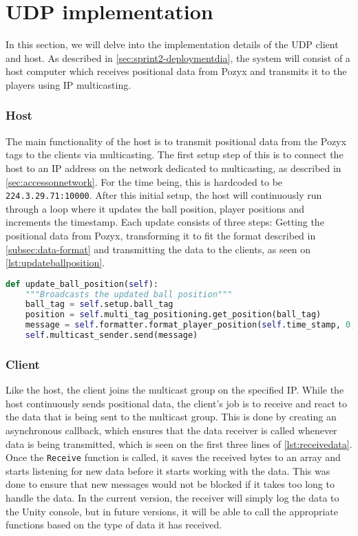 \section{UDP implementation}
In this section, we will delve into the implementation details of the UDP client and host.
As described in \autoref{sec:sprint2-deploymentdia}, the system will consist of a host computer which receives positional data from Pozyx and transmits it to the players using IP multicasting.

\subsubsection{Host}
The main functionality of the host is to transmit positional data from the Pozyx tags to the clients via multicasting.
The first setup step of this is to connect the host to an IP address on the network dedicated to multicasting, as described in \autoref{sec:accessonnetwork}.
For the time being, this is hardcoded to be \texttt{224.3.29.71:10000}.
After this initial setup, the host will continuously run through a loop where it updates the ball position, player positions and increments the timestamp.
\noindent
Each update consists of three steps: Getting the positional data from Pozyx, transforming it to fit the format described in \autoref{subsec:data-format} and transmitting the data to the clients, as seen on \autoref{lst:updateballposition}.

\begin{lstlisting}[caption={Updating ball position}, captionpos=b,language=Python,label={lst:updateballposition}]
def update_ball_position(self):
    """Broadcasts the updated ball position"""
    ball_tag = self.setup.ball_tag
    position = self.multi_tag_positioning.get_position(ball_tag)
    message = self.formatter.format_player_position(self.time_stamp, 0, position.x, position.y)
    self.multicast_sender.send(message)
\end{lstlisting}

\subsubsection{Client}
Like the host, the client joins the multicast group on the specified IP.
While the host continuously sends positional data, the client's job is to receive and react to the data that is being sent to the multicast group.
This is done by creating an asynchronous callback, which ensures that the data receiver is called whenever data is being transmitted, which is seen on the first three lines of \autoref{lst:receivedata}.
Once the \texttt{Receive} function is called, it saves the received bytes to an array and starts listening for new data before it starts working with the data.
This was done to ensure that new messages would not be blocked if it takes too long to handle the data.
In the current version, the receiver will simply log the data to the Unity console, but in future versions, it will be able to call the appropriate functions based on the type of data it has received.

